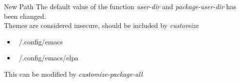 \begin{frame}{New Path}
The default value of the function \emph{user-dir} and
\emph{package-user-dir} has been changed.\\

Themes are considered insecure, should be included by \emph{customize}
\\

\begin{itemize}
\item ~/.config/emacs
\item ~/.config/emacs/elpa
\end{itemize}

This can be modified by \emph{customize-package-all}
  
\end{frame}

